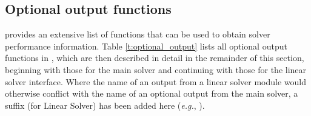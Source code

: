 \subsection{Optional output functions}\label{ss:optional_output}

{\kinsol} provides an extensive list of functions that can be used to obtain
solver performance information.
Table \ref{t:optional_output} lists all optional output functions in {\kinsol},
which are then described in detail in the remainder of this section, beginning with those
for the main {\kinsol} solver and continuing with those for the
{\kinls} linear solver interface. Where the name of an output from a
linear solver module would otherwise conflict with the name of an
optional output from the main solver, a suffix  (for Linear
Solver) has been added here ({\em e.g.}, ).

\newlength{\colAA}
\settowidth{\colAA}{No. of $F$ calls for D.Q. Jacobian[-vector] evals.}
\newlength{\colBB}



